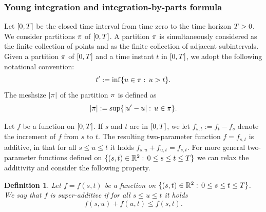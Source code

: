 \documentclass[10pt,a4paper]{article}
\newtheorem{defi}[thm]{Definition}
\begin{document}
\begin{appendices}
\subsubsection*{Young integration and integration-by-parts formula}
 Let ${[0,T]}$ be the closed time interval from time zero to the time horizon $T>0$. We consider partitions $\pi$ of ${[0,T]}$. 
 A partition $\pi$ is simultaneously considered  as the finite collection of points and as the finite collection of adjacent subintervals. Given a partition $\pi$ of ${[0,T]}$ and a time instant $t$ in ${[0,T]}$,  we adopt the following notational convention: 
 \begin{equation}\label{eq.notationAboutPartition}
 t^{\prime}:=  \inf \lbrace u \in \pi : \, u> t \rbrace .
 \end{equation} 
 The meshsize $\left\lvert {\pi} \right\rvert$ of the partition $\pi$ is defined as 
 \begin{equation*}
 \left\lvert {\pi} \right\rvert :=  \sup \lbrace \left\lvert {u^{\prime}- u} \right\rvert: \, u \in \pi \rbrace.
 \end{equation*}
 
Let $f$ be a function on ${[0,T]}$. If $s$ and $t$ are  in ${[0,T]}$,  we let $f_{s,t}:=f_t - f_s$ denote  the increment of $f$ from $s$ to $t$. The resulting two-parameter function $f=f_{s,t}$ is additive, in that for all $s\leq u\leq t$ it holds $f_{s,u} + f_{u,t} = f_{s,t}$. For more general two-parameter functions  defined on $\lbrace (s,t) \in \mathbb{R}^{2}:\, 0 \leq s \leq t \leq T \rbrace$ we can relax the additivity and consider the following property. 
\begin{defi}
	Let $f=f(s,t)$ be a function on $\lbrace (s,t) \in \mathbb{R}^{2}:\, 0 \leq s \leq t \leq T \rbrace$. We say that $f$ is super-additive if  for all $s\leq u\leq t$ it holds 
	\begin{equation*}
	f(s,u) + f(u,t) \leq f(s,t). 
	\end{equation*}
\end{defi}


\end{appendices}
\end{document}
